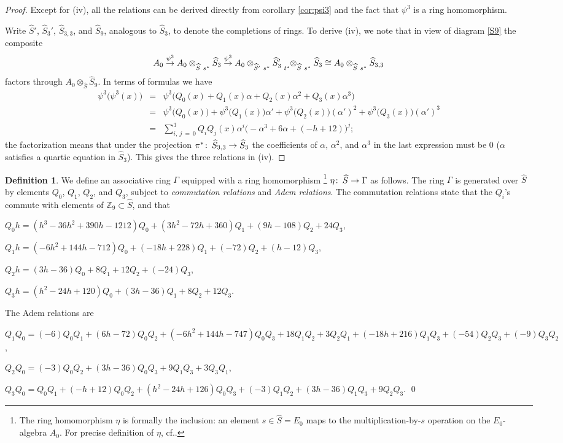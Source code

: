 \documentclass{gtpart}
\theoremstyle{definition}
\newtheorem{defn}[thm]{Definition}
\theoremstyle{remark}
\def\co{\colon\thinspace}
\newcommand{\mb}[1]{\mathbb{#1}}
\newcommand{\cff}[2]{cf.\thinspace{\cite[#1]{#2}}}
\newcommand{\BZ}{{\mb Z}}
\newcommand{\HS}{\widehat{S}}
\newcommand{\A}{\alpha}
\newcommand{\p}{\psi^3}
\newcommand{\G}{\Gamma}
\begin{document}
\begin{proof}
 Except for (iv), all the relations can be derived directly from corollary \ref{cor:psi3} and the fact that $\p$ is a ring homomorphism.  

 Write $\HS'$, $\HS_3'$, $\HS_{3,3}$, and $\HS_9$, analogous to $\HS_3$, to denote the completions of rings.  
 To derive (iv), we note that in view of diagram \eqref{S9} the composite 
 \[
  A_0 \stackrel{\p}{\to} A_0 \tensor[]{\otimes}{_{\HS}_{~s^*}} \HS_3 
  \stackrel{\p}{\to} A_0 \tensor[]{\otimes}{_{\HS'}_{~s^*}} \HS_3' \tensor[_{t^*}]{\otimes}{_{\HS}_{~s^*}} \HS_3 
  \cong A_0 \tensor[]{\otimes}{_{\HS}_{~s^*}} \HS_{3,3} 
 \]
 factors through $A_0 \otimes_{\HS} \HS_9$.  In terms of formulas we have 
 \begin{eqnarray*}
  \p \big( \p(x) \big) & = & \p \big( Q_0(x) + Q_1(x) \A + Q_2(x) \A^2 + Q_3(x) \A^3 \big) \\
                       & = & \p \big( Q_0(x) \big) + \p \big( Q_1(x) \big) \A' + \p \big( Q_2(x) \big) (\A')^2 + \p \big( Q_3(x) \big) (\A')^3 \\
                       & = & \sum_{i,~j~=~0}^3 Q_iQ_j(x) \A^i \big( -\A^3 + 6 \A + (-h + 12) \big)^j; 
 \end{eqnarray*}
 the factorization means that under the projection $\pi^* \co \HS_{3,3} \to \HS_3$ the coefficients of $\A$, $\A^2$, and $\A^3$ in the last expression must be 0 
 ($\A$ satisfies a quartic equation in $\HS_3$).  This gives the three relations in (iv).
\end{proof}

\begin{defn}
\label{def}
 We define an associative ring $\G$ equipped with a ring homomorphism 
 \footnote{The ring homomorphism $\eta$ is formally the inclusion: an element $s \in \HS = E_0$ maps to the multiplication-by-$s$ operation on the $E_0$-algebra $A_0$.  
 For precise definition of $\eta$, \cff{section 6}{cong}.  } $\eta \co \HS \to \G$ as follows.  
 The ring $\G$ is generated over $\HS$ by elements $Q_0$, $Q_1$, $Q_2$, and $Q_3$, subject to {\em commutation relations} and {\em Adem relations}.  
 The commutation relations state that the $Q_i$'s commute with elements of $\BZ_9 \subset \HS$, and that 

 $Q_0 h = (h^3 - 36 h^2 + 390 h - 1212) Q_0 + (3 h^2 - 72 h + 360) Q_1 + (9 h - 108) Q_2 + 24 Q_3$, 

 $Q_1 h = (-6 h^2 + 144 h - 712) Q_0 + (-18 h + 228) Q_1 + (-72) Q_2 + (h - 12) Q_3$, 

 $Q_2 h = (3 h - 36) Q_0 + 8 Q_1 + 12 Q_2 + (-24) Q_3$, 

 $Q_3 h = (h^2 - 24 h + 120) Q_0 + (3 h - 36) Q_1 + 8 Q_2 + 12 Q_3$.  

 The Adem relations are 

 $Q_1Q_0 = (-6) Q_0Q_1 + (6 h - 72) Q_0Q_2 + (-6 h^2 + 144 h - 747) Q_0Q_3 + 18 Q_1Q_2 + 3 Q_2Q_1 + (-18 h + 216) Q_1Q_3 + (-54) Q_2Q_3 + (-9) Q_3Q_2$, 

 $Q_2Q_0 = (-3) Q_0Q_2 + (3 h - 36) Q_0Q_3 + 9 Q_1Q_3 + 3 Q_3Q_1$, 

 $Q_3Q_0 = Q_0Q_1 + (-h + 12) Q_0Q_2 + (h^2 - 24 h + 126) Q_0Q_3 + (-3) Q_1Q_2 + (3 h - 36) Q_1Q_3 + 9 Q_2Q_3$.  
\qed
\end{defn}
\end{document}
